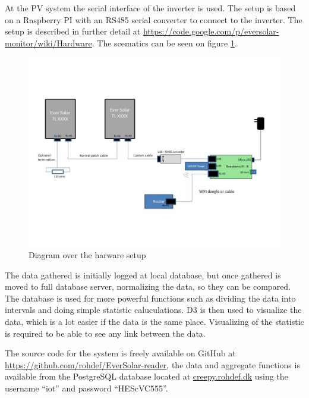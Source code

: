 At the PV system the serial interface of the inverter is used.  The
setup is based on a Raspberry PI with an RS485 serial converter to
connect to the inverter.  The setup is described in further detail at
\url{https://code.google.com/p/eversolar-monitor/wiki/Hardware}.  The
scematics can be seen on figure \ref{fig:hardware}.

\begin{figure}[h]
  \centering
  \includegraphics[width=1\textwidth]{hardware}
  \caption{Diagram over the harware setup}
  \label{fig:hardware}
\end{figure}

The data gathered is initially logged at local database, but once
gathered is moved to full database server, normalizing the data, so
they can be compared.  The database is used for more powerful
functions such as dividing the data into intervals and doing simple
statistic caluculations.
D3 is then used to visualize the data, which is a lot easier if the data 
is the same place. Visualizing of the statistic is required to be able to 
see any link between the data.

The source code for the system is freely available on GitHub at
\url{https://github.com/rohdef/EverSolar-reader}, the data and
aggregate functions is available from the PostgreSQL database located
at \url{creepy.rohdef.dk} using the username ``iot'' and password
``HEScVC555''.

